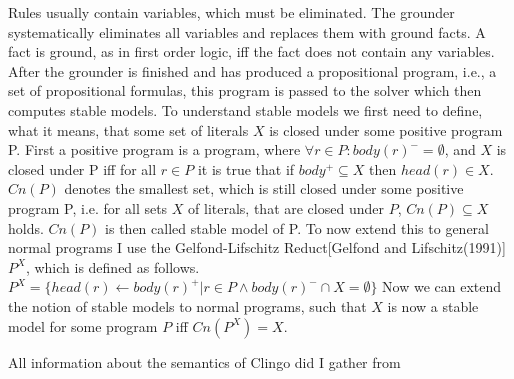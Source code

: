 \documentclass[hyperref, bachelorofscience]{cgvpub}
\begin{document}
Rules usually contain variables, which must be eliminated. The grounder systematically eliminates all variables and replaces them with ground facts. A fact is ground, as in first order logic, iff the fact does not contain any variables. \\
After the grounder is finished and has produced a propositional program, i.e., a set of propositional formulas, this program is passed to the solver which then computes stable models.
To understand stable models we first need to define, what it means, that some set of literals $X$ is closed under some positive program P. First a positive program is a program, where $\forall r \in P: body(r)^{-} = \emptyset$, and $X$ is closed under P iff for all  $r \in P$ it is true that if $body^{+} \subseteq X$ then $head(r) \in X $. \\
$Cn(P)$ denotes the smallest set, which is still closed under some positive program P, i.e. 
for all sets $X$ of literals, that are closed under $P$, $ Cn(P) \subseteq X$ holds.
$Cn(P)$ is then called stable model of P.
To now extend this to general normal programs I use the Gelfond-Lifschitz Reduct[Gelfond and Lifschitz(1991)] $P^X$, which is defined as follows.
$P^X = \{ head(r) \leftarrow body(r)^{+} | r \in P \land body(r)^{-} \cap X = \emptyset \}$
Now we can extend the notion of stable models to normal programs, such that $X$ is now a stable model for some program $P$ iff $Cn(P^X) = X$.

All information about the semantics of Clingo did I gather from \cite{G2019} 
\end{document}
